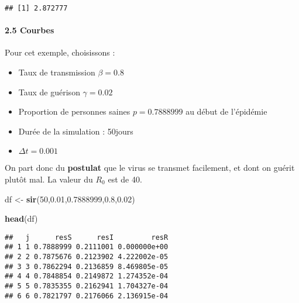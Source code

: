 \documentclass[
]{article}
\newenvironment{Shaded}{\begin{snugshade}}{\end{snugshade}}
\newcommand{\DecValTok}[1]{\textcolor[rgb]{0.00,0.00,0.81}{#1}}
\newcommand{\FloatTok}[1]{\textcolor[rgb]{0.00,0.00,0.81}{#1}}
\newcommand{\KeywordTok}[1]{\textcolor[rgb]{0.13,0.29,0.53}{\textbf{#1}}}
\newcommand{\NormalTok}[1]{#1}
\newcommand{\StringTok}[1]{\textcolor[rgb]{0.31,0.60,0.02}{#1}}
\providecommand{\tightlist}{%
  \setlength{\itemsep}{0pt}\setlength{\parskip}{0pt}}
\begin{document}
\begin{verbatim}
## [1] 2.872777
\end{verbatim}

\hypertarget{courbes}{%
\paragraph{2.5 Courbes}\label{courbes}}

Pour cet exemple, choisissons :

\begin{itemize}
\tightlist
\item
  Taux de transmission \(\beta = 0.8\)
\item
  Taux de guérison \(\gamma=0.02\)
\item
  Proportion de personnes saines \(p=0.7888999\) au début de l'épidémie
\item
  Durée de la simulation : 50jours
\item
  \(\Delta t= 0.001\)
\end{itemize}

On part donc du \textbf{postulat} que le virus se transmet facilement,
et dont on guérit plutôt mal. La valeur du \(R_0\) est de 40.

\begin{Shaded}
\begin{Highlighting}[]
\NormalTok{df <-}\StringTok{ }\KeywordTok{sir}\NormalTok{(}\DecValTok{50}\NormalTok{,}\FloatTok{0.01}\NormalTok{,}\FloatTok{0.7888999}\NormalTok{,}\FloatTok{0.8}\NormalTok{,}\FloatTok{0.02}\NormalTok{)}

\KeywordTok{head}\NormalTok{(df)}
\end{Highlighting}
\end{Shaded}

\begin{verbatim}
##   j      resS      resI         resR
## 1 1 0.7888999 0.2111001 0.000000e+00
## 2 2 0.7875676 0.2123902 4.222002e-05
## 3 3 0.7862294 0.2136859 8.469805e-05
## 4 4 0.7848854 0.2149872 1.274352e-04
## 5 5 0.7835355 0.2162941 1.704327e-04
## 6 6 0.7821797 0.2176066 2.136915e-04
\end{verbatim}
\end{document}
